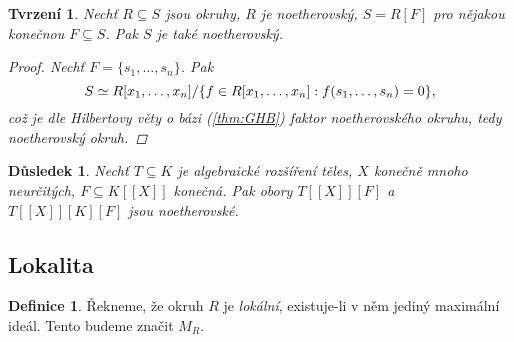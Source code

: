 \documentclass[11pt,a4paper]{article}
\newcommand*{\ml}[1]{\[\textstyle\let\displaystyle\textstyle#1\]}	%
\newcounter{numb}
\theoremstyle{definition}
\newtheorem*{definice}{Definice}
\theoremstyle{plain}
\newtheorem{tvrzeni}[numb]{Tvrzení}
\newtheorem{dusledek}[numb]{Důsledek}
\begin{document}
\begin{tvrzeni}
	Nechť $R \subseteq S$ jsou okruhy, $R$ je noetherovský, $S = R[F]$ pro nějakou konečnou $F \subseteq S$. Pak $S$ je také noetherovský.

	\begin{proof}
		Nechť $F = \{s_1, \hdots, s_n\}$. Pak
		\ml{
			S \simeq R[x_1, \hdots, x_n] / \{f \in R[x_1, \hdots, x_n]: f(s_1, \hdots, s_n) = 0\},
		}
		což je dle Hilbertovy věty o bázi (\ref{thm:GHB}) faktor noetherovského okruhu, tedy noetherovský okruh.
	\end{proof}
\end{tvrzeni}

\begin{dusledek} \label{thm:noe}
	Nechť $T \subseteq K$ je algebraické rozšíření těles, $X$ konečně mnoho neurčitých, $F \subseteq K[[X]]$ konečná. Pak obory $T[[X]][F]$ a $T[[X]][K][F]$ jsou noetherovské.
\end{dusledek}


\subsection{Lokalita}

\begin{definice}
	Řekneme, že okruh $R$ je \emph{lokální}, existuje-li v něm jediný maximální ideál. Tento budeme značit $M_R$.
\end{definice}
\end{document}
